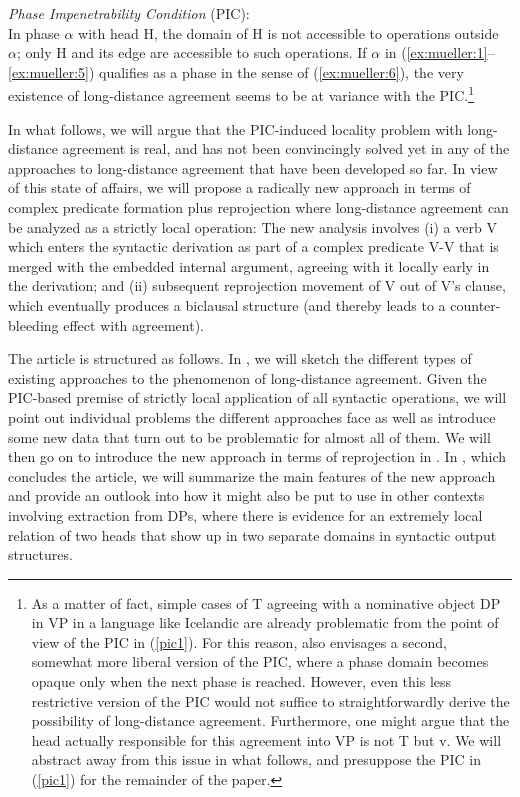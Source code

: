 \documentclass[output=paper
,modfonts
,nonflat]{langsci/langscibook}
\begin{document}
	\ea\label{ex:mueller:6} {\itshape Phase Impenetrability Condition} \label{pic1}(PIC):\\
	In phase $\alpha$ with head H, the domain of H is not accessible to
	operations outside $\alpha$; only H and its edge are accessible to such
	operations.
	\z
{\noindent}If $\alpha$ in (\ref{ex:mueller:1}--\ref{ex:mueller:5}) qualifies as a phase in the sense of
	(\ref{ex:mueller:6}), the very existence of long-distance agreement seems to be at
	variance with the PIC.\footnote{\label{fn1}As a matter of fact, simple cases of T
		agreeing with a nominative object DP in VP in a language like
		Icelandic are already problematic from the point of view of the PIC
		in (\ref{pic1}). For this reason, \citet{Chomsky:01} also envisages a
		second, somewhat more liberal version of the PIC, where a phase
		domain becomes opaque only when the next phase is reached. However, even
		this less restrictive version of the PIC would not suffice to
		straightforwardly derive the possibility of long-distance
		agreement. Furthermore, one might argue that the head actually
		responsible for this agreement into VP is not T but v. We will
		abstract away from this issue in what follows, and presuppose the
		PIC in (\ref{pic1}) for the remainder of the paper.}
	
\noindent In what follows, we will argue that the PIC-induced locality problem
	with long-distance agreement is real, and has not been
	convincingly solved yet in any of the approaches to long-distance
	agreement that have been developed so far. In view of this state of
	affairs, we will propose a radically new approach in terms of complex
	predicate formation plus reprojection where long-distance agreement
	can be analyzed as a strictly local operation: The new analysis  involves (i) a verb
	V which enters the syntactic derivation as part of a complex
	predicate V-V that is merged with the embedded internal argument,
	agreeing with it locally early in the derivation; and (ii) subsequent
	reprojection movement of V out of V's clause, which eventually
	produces a biclausal structure (and thereby leads to a
	counter-bleeding effect with agreement). 
	
	The article is structured as follows. In , we will sketch the
	different types of existing approaches to the phenomenon of
	long-distance agreement. Given the PIC-based premise of strictly local
	application of all syntactic operations, we will point out individual
	problems the different approaches face as well as introduce some new
	data that turn out to be problematic for almost all of them. We will
	then go on to introduce the new approach in terms of reprojection in
	. In , which concludes the article, we will
	summarize the main features of the new approach and provide an outlook
	into how it might also be put to use in other contexts involving
	extraction from DPs, where there is evidence for an extremely local
	relation of two heads that show up in two separate domains in
	syntactic output structures.
	
\end{document}

